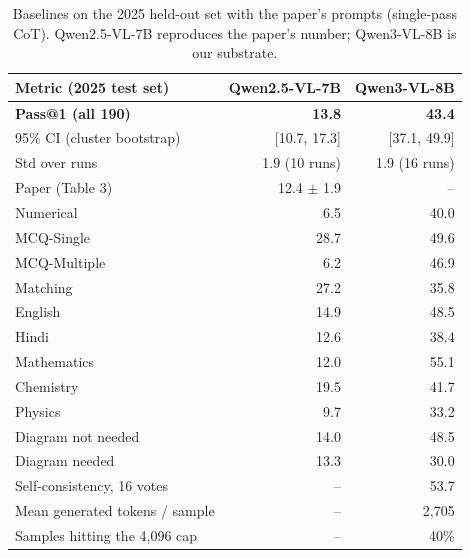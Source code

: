 \begin{table}[t]
\centering
\footnotesize
\caption{Baselines on the 2025 held-out set with the paper's prompts (single-pass CoT). Qwen2.5-VL-7B reproduces the paper's number; Qwen3-VL-8B is our substrate.}
\label{tab:baseline}
\setlength{\tabcolsep}{3.5pt}
\begin{tabular}{lrr}
\toprule
Metric (2025 test set) & Qwen2.5-VL-7B & Qwen3-VL-8B \\
\midrule
\textbf{Pass@1 (all 190)} & \textbf{13.8} & \textbf{43.4} \\
95\% CI (cluster bootstrap) & [10.7, 17.3] & [37.1, 49.9] \\
Std over runs & 1.9 (10 runs) & 1.9 (16 runs) \\
Paper (Table 3) & 12.4 $\pm$ 1.9 & -- \\
Numerical & 6.5 & 40.0 \\
MCQ-Single & 28.7 & 49.6 \\
MCQ-Multiple & 6.2 & 46.9 \\
Matching & 27.2 & 35.8 \\
English & 14.9 & 48.5 \\
Hindi & 12.6 & 38.4 \\
Mathematics & 12.0 & 55.1 \\
Chemistry & 19.5 & 41.7 \\
Physics & 9.7 & 33.2 \\
Diagram not needed & 14.0 & 48.5 \\
Diagram needed & 13.3 & 30.0 \\
Self-consistency, 16 votes & -- & 53.7 \\
Mean generated tokens / sample & -- & 2,705 \\
Samples hitting the 4{,}096 cap & -- & 40\% \\
\bottomrule
\end{tabular}
\end{table}

